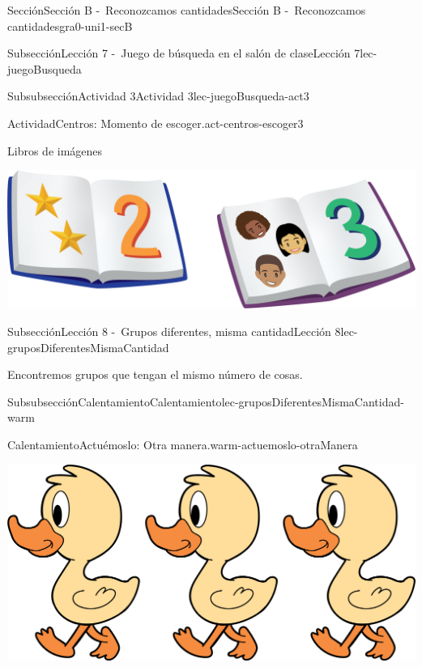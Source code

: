 \documentclass[twoside,10pt,]{article}
\begin{document}
\begin{sectionptx}{Sección}{Sección B -~Reconozcamos cantidades}{}{Sección B -~Reconozcamos cantidades}{}{}{gra0-uni1-secB}
\begin{subsectionptx}{Subsección}{Lección 7 -~Juego de búsqueda en el salón de clase}{}{Lección 7}{}{}{lec-juegoBusqueda}
\begin{subsubsectionptx}{Subsubsección}{Actividad 3}{}{Actividad 3}{}{}{lec-juegoBusqueda-act3}
\begin{activity}{Actividad}{Centros: Momento de escoger.}{act-centros-escoger3}
\begin{sidebyside}{2}{0.025}{0.025}{0.05}
\begin{sbspanel}{0.45}%
Libros de imágenes%
\par
\includegraphics[width=\linewidth]{external/png-source/K.1.D Beta Student Workbooks.Books.png}
\end{sbspanel}%
\end{sidebyside}%
\end{activity}%
\end{subsubsectionptx}
\end{subsectionptx}
%
%
\typeout{************************************************}
\typeout{************************************************}
%
\begin{subsectionptx}{Subsección}{Lección 8 -~Grupos diferentes, misma cantidad}{}{Lección 8}{}{}{lec-gruposDiferentesMismaCantidad}
\begin{introduction}{}%
Encontremos grupos que tengan el mismo número de cosas.%
\end{introduction}%
%
%
\typeout{************************************************}
\typeout{************************************************}
%
\begin{subsubsectionptx}{Subsubsección}{Calentamiento}{}{Calentamiento}{}{}{lec-gruposDiferentesMismaCantidad-warm}
\begin{exploration}{Calentamiento}{Actuémoslo: Otra manera.}{warm-actuemoslo-otraManera}%
\begin{image}{0.2}{0.6}{0.2}{}%
\includegraphics[width=\linewidth]{external/png-source/3 ducks.png}

\end{image}
\end{exploration}
\end{subsubsectionptx}
\end{subsectionptx}
\end{sectionptx}
\end{document}

